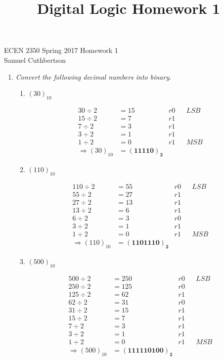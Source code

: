 \documentclass[12pt]{article}
\begin{document}
\title{Digital Logic Homework 1}

ECEN 2350 Spring 2017 \hfill Homework 1\\
Samuel Cuthbertson

\hrulefill

\begin{enumerate}

	\item \textit{Convert the following decimal numbers into binary.}
	\begin{enumerate}

		\item \textit{$(30)_{10}$}

    	\begin{align*}
    	30 \div 2 &= 15 &r0 &&LSB \\
        15 \div 2 &= 7 &r1 \\
        7 \div 2 &= 3 &r1 \\
        3 \div 2 &= 1 &r1 \\
        1 \div 2 &= 0 &r1 &&MSB \\
        \Rightarrow (30)_{10} &= \boxed{\mathbf{(11110)_2}}
    	\end{align*}

    	\item \textit{$(110)_{10}$}

    	\begin{align*}
    	110 \div 2 &= 55 &r0 &&LSB \\
        55 \div 2 &= 27 &r1 \\
        27 \div 2 &= 13 &r1 \\
        13 \div 2 &= 6 &r1 \\
        6 \div 2 &= 3 &r0 \\
        3 \div 2 &= 1 &r1 \\
        1 \div 2 &= 0 &r1 &&MSB \\
        \Rightarrow (110)_{10} &= \boxed{\mathbf{(1101110)_2}}
    	\end{align*}

    	\newpage
    	\addtocounter{enumii}{1}
    	\item \textit{$(500)_{10}$}

    	\begin{align*}
    	500 \div 2 &= 250 &r0 &&LSB \\
        250 \div 2 &= 125 &r0 \\
        125 \div 2 &= 62 &r1 \\
        62 \div 2 &= 31 &r0 \\
        31 \div 2 &= 15 &r1 \\
        15 \div 2 &= 7 &r1 \\
        7 \div 2 &= 3 &r1 \\
        3 \div 2 &= 1 &r1 \\
        1 \div 2 &= 0 &r1 &&MSB \\
        \Rightarrow (500)_{10} &= \boxed{\mathbf{(111110100)_2}}
    	\end{align*}


\end{enumerate}
\end{enumerate}
\end{document}
